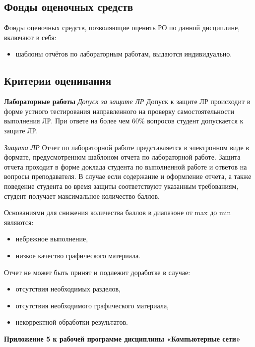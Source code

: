 \begin{center}
\subsection*{Фонды оценочных средств}

Фонды оценочных средств, позволяющие оценить РО по данной дисциплине, включают в себя:
\begin{itemize}
\item шаблоны отчётов по лабораторным работам, выдаются индивидуально.
\end{itemize}

\subsection*{Критерии оценивания}




\noindent\textbf{Лабораторные работы}
\textit{Допуск за защите ЛР}
Допуск к защите ЛР происходит в форме устного тестирования направленного на проверку самостоятельности выполнения ЛР. При ответе на более чем 60\% вопросов студент допускается к защите ЛР.

\noindent\textit{Защита ЛР}
Отчет по лабораторной работе представляется в электронном виде в формате, предусмотренном шаблоном отчета по лабораторной работе.
Защита отчета проходит в форме доклада студента по выполненной работе и ответов на вопросы преподавателя.
В случае если содержание и оформление отчета, а также поведение студента во время защиты соответствуют указанным требованиям, студент получает максимальное количество баллов.

Основаниями для снижения количества баллов в диапазоне от max до min являются:
\begin{itemize}
\item небрежное выполнение,
\item низкое качество графического материала.
\end{itemize}

Отчет не может быть принят и подлежит доработке в случае:
\begin{itemize}
\item отсутствия необходимых разделов,
\item отсутствия необходимого графического материала,
\item некорректной обработки результатов.
\end{itemize}




\newpage
\begin{landscape}
\begin{flushright}
\textbf{Приложение 5
к рабочей программе дисциплины
«Компьютерные сети»}
\end{flushright}



\end{landscape}
\end{center}
